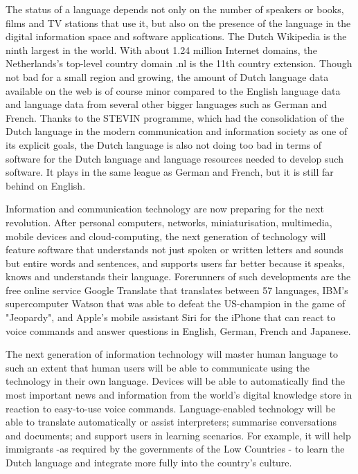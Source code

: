 \begin{multicols}{2}
The status of a language depends not only on the number of speakers or books, films and TV stations that use it, but also on the presence of the language in the digital information space and software applications.  The Dutch Wikipedia is the ninth largest in the world. With about 1.24 million Internet domains, the Netherlands's top-level country domain .nl is the 11th country extension. Though not bad for a small region and growing, the amount of Dutch language data available on the web is of course minor compared to the English language data and language data from several other bigger languages such as German and French. Thanks to the  STEVIN programme, which had the consolidation of the Dutch language in the modern communication and information society as one of its explicit goals, the Dutch language is also not doing too bad in terms of software for the Dutch language and language resources needed to develop such software. It plays in the same league as German and French, but it is still far behind on English.

Information and communication technology are now preparing for the next revolution. After personal computers, networks, miniaturisation, multimedia, mobile devices and cloud-computing, the next generation of technology will feature software that understands not just spoken or written letters and sounds but entire words and sentences, and supports users far better because it speaks, knows and understands their language. Forerunners of such developments are the free online service Google Translate that translates between 57 languages, IBM's supercomputer Watson that was able to defeat the US-champion in the game of "Jeopardy", and Apple's mobile assistant Siri for the iPhone that can react to voice commands and answer questions in English, German, French and Japanese.

The next generation of information technology will master human language to such an extent that human users will be able to communicate using the technology in their own language. Devices will be able to automatically find the most important news and information from the world's digital knowledge store in reaction to easy-to-use voice commands. Language-enabled technology will be able to translate automatically or assist interpreters; summarise conversations and documents; and support users in learning scenarios. For example, it will help immigrants -as required by the governments of the Low Countries - to learn the Dutch language and integrate more fully into the country's culture.


\end{multicols}
